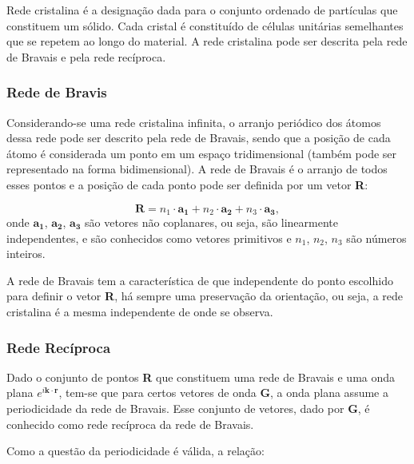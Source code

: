 \par Rede cristalina é a designação dada para o conjunto ordenado de partículas que constituem um sólido. Cada cristal é constituído de células unitárias semelhantes que se repetem ao longo do material. A rede cristalina pode ser descrita pela rede de Bravais e pela rede recíproca\cite{qm_fis2}.

    \subsubsection{Rede de Bravis}

      \par Considerando-se uma rede cristalina infinita, o arranjo periódico dos átomos dessa rede pode ser descrito pela rede de Bravais, sendo que a posição de cada átomo é considerada um ponto em um espaço tridimensional (também pode ser representado na forma bidimensional). A rede de Bravais é o arranjo de todos esses pontos e a posição de cada ponto pode ser definida por um vetor \textbf{R}: 

      \begin{equation}\label{redeBravis_eq1}
        \mathbf{R} = n_{1}\cdot \mathbf{a_{1}} + n_{2}\cdot \mathbf{a_{2}} + n_{3}\cdot \mathbf{a_{3}},
      \end{equation}
onde $\mathbf{a_{1}}$, $\mathbf{a_{2}}$, $\mathbf{a_{3}}$ são vetores não coplanares, ou seja, são linearmente independentes, e são conhecidos como vetores primitivos e $n_1$, $n_2$, $n_3$ são números inteiros.\cite{qm_fis5}

      \par A rede de Bravais tem a característica de que independente do ponto escolhido para definir o vetor \textbf{R}, há sempre uma preservação da orientação, ou seja, a rede cristalina é a mesma independente de onde se observa\cite{qm_fis5}.

    \subsubsection{Rede Recíproca}

      \par Dado o conjunto de pontos \textbf{R} que constituem uma rede de Bravais e uma onda plana $e^{i \mathbf{k\cdot r}}$, tem-se que para certos vetores de onda \textbf{G}, a onda plana assume a periodicidade da rede de Bravais. Esse conjunto de vetores, dado por \textbf{G}, é conhecido como rede recíproca da rede de Bravais.  
      
      \par Como a questão da periodicidade é válida, a relação:

